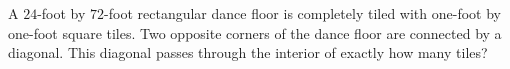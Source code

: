 A $24$-foot by $72$-foot rectangular dance floor is completely tiled with one-foot by one-foot square tiles. Two opposite corners of the dance floor are connected by a diagonal. This diagonal passes through the interior of exactly how many tiles?
